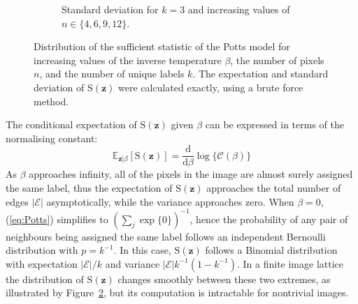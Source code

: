 \documentclass[nojss,shortnames]{jss}\usepackage[]{graphicx}\usepackage[]{color}
\begin{document}
\begin{figure}
\begin{subfigure}{0.45\textwidth}
                \caption{Standard deviation for $k=3$ and increasing values of $n \in \{4, 6, 9, 12\}$.}
                \label{f:exact_var_n}
        \end{subfigure}%
\caption[Distribution of the sufficient statistic of the Potts model]{Distribution of the sufficient statistic of the Potts model for increasing values of the inverse temperature $\beta$, the number of pixels $n$, and the number of unique labels $k$. The expectation and standard deviation of $\mathrm{S}(\mathbf{z})$ were calculated exactly, using a brute force method.}
\label{f:exact_beta}
\end{figure}

The conditional expectation of $\mathrm{S}(\mathbf{z})$ given $\beta$ can be expressed in terms of the normalising constant:
  \begin{equation}
  \label{eq:expSz}
\mathbb{E}_{\mathbf{z} | \beta}[\mathrm{S}(\mathbf{z})] = \frac{\mathrm d}{\mathrm d \beta} \log\{ \mathcal{C}(\beta) \}
  \end{equation}
 As $\beta$ approaches infinity, all of the pixels in the image are almost surely assigned the same label, thus the expectation of $\mathrm{S}(\mathbf{z})$ approaches the total number of edges $|\mathcal{E}|$ asymptotically, while the variance approaches zero. When $\beta = 0$, (\ref{eq:Potts}) simplifies to $\left(\sum_j \exp\{0\}\right)^{-1}$, hence the probability of any pair of neighbours being assigned the same label follows an independent Bernoulli distribution with $p = k^{-1}$. In this case, $\mathrm{S}(\mathbf{z})$ follows a Binomial distribution with expectation $|\mathcal{E}| /k$ and variance $|\mathcal{E}| k^{-1} (1 - k^{-1})$. In a finite image lattice the distribution of $\mathrm{S}(\mathbf{z})$ changes smoothly between these two extremes, as illustrated by Figure~\ref{f:exact_beta}, but its computation is intractable for nontrivial images.
\end{document}
